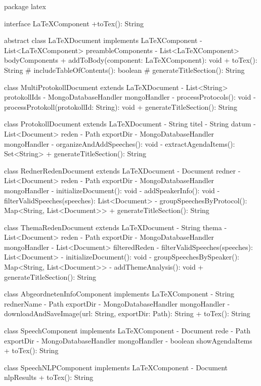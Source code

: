 package latex {

  interface LaTeXComponent {
    +toTex(): String
  }

  abstract class LaTeXDocument implements LaTeXComponent {
    - List<LaTeXComponent> preambleComponents
    - List<LaTeXComponent> bodyComponents
    + addToBody(component: LaTeXComponent): void
    + toTex(): String
    # includeTableOfContents(): boolean
    # generateTitleSection(): String
  }

  class MultiProtokollDocument extends LaTeXDocument {
    - List<String> protokollIds
    - MongoDatabaseHandler mongoHandler
    - processProtocols(): void
    - processProtokoll(protokollId: String): void
    + generateTitleSection(): String
  }

  class ProtokollDocument extends LaTeXDocument {
    - String titel
    - String datum
    - List<Document> reden
    - Path exportDir
    - MongoDatabaseHandler mongoHandler
    - organizeAndAddSpeeches(): void
    - extractAgendaItems(): Set<String>
    + generateTitleSection(): String
  }

  class RednerRedenDocument extends LaTeXDocument {
    - Document redner
    - List<Document> reden
    - Path exportDir
    - MongoDatabaseHandler mongoHandler
    - initializeDocument(): void
    - addSpeakerInfo(): void
    - filterValidSpeeches(speeches): List<Document>
    - groupSpeechesByProtocol(): Map<String, List<Document>>
    + generateTitleSection(): String
  }

  class ThemaRedenDocument extends LaTeXDocument {
    - String thema
    - List<Document> reden
    - Path exportDir
    - MongoDatabaseHandler mongoHandler
    - List<Document> filteredReden
    - filterValidSpeeches(speeches): List<Document>
    - initializeDocument(): void
    - groupSpeechesBySpeaker(): Map<String, List<Document>>
    - addThemeAnalysis(): void
    + generateTitleSection(): String
  }

  class AbgeordnetenInfoComponent implements LaTeXComponent {
    - String rednerName
    - Path exportDir
    - MongoDatabaseHandler mongoHandler
    - downloadAndSaveImage(url: String, exportDir: Path): String
    + toTex(): String
  }

  class SpeechComponent implements LaTeXComponent {
    - Document rede
    - Path exportDir
    - MongoDatabaseHandler mongoHandler
    - boolean showAgendaItems
    + toTex(): String
  }

  class SpeechNLPComponent implements LaTeXComponent {
    - Document nlpResults
    + toTex(): String
  }

}
